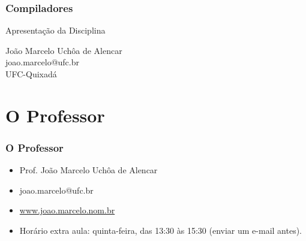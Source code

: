 \documentclass[table]{beamer}
\begin{document}
\begin{frame}
   \frametitle{Compiladores}
   \large
   \begin{center}
      Apresentação da Disciplina 
   \end{center}
   \scriptsize
   \begin{center}
      João Marcelo Uchôa de Alencar \\
      joao.marcelo@ufc.br \\
      UFC-Quixadá
   \end{center}
\end{frame}

\begin{frame}
   \tableofcontents
\end{frame}

\section{O Professor}
\begin{frame}
   \frametitle{O Professor}
   \begin{itemize}
      \item Prof. João Marcelo Uchôa de Alencar
      \item joao.marcelo@ufc.br
      \item \url{www.joao.marcelo.nom.br}
      \item Horário extra aula: quinta-feira, das 13:30 às 15:30 (enviar um e-mail antes).
   \end{itemize}
\end{frame}
\end{document}
